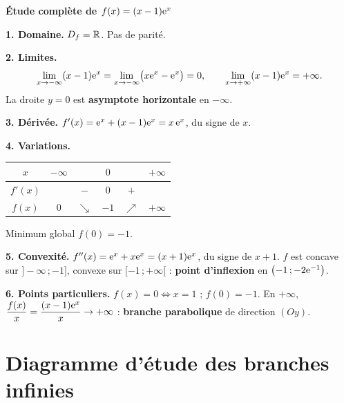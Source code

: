 \exerciceresolu
\textbf{Étude complète de $f(x)=(x-1)\mathrm{e}^{x}$}

\solution

\textbf{1. Domaine.} $D_f=\mathbb{R}$. Pas de parité.

\textbf{2. Limites.}
\[
\lim_{x\to-\infty}(x-1)\mathrm{e}^{x}=\lim_{x\to-\infty}\bigl(x\mathrm{e}^{x}-\mathrm{e}^{x}\bigr)=0,
\qquad
\lim_{x\to+\infty}(x-1)\mathrm{e}^{x}=+\infty.
\]
La droite $y=0$ est \textbf{asymptote horizontale} en $-\infty$.

\textbf{3. Dérivée.} $f'(x)=\mathrm{e}^{x}+(x-1)\mathrm{e}^{x}=x\,\mathrm{e}^{x}$, du signe de $x$.

\textbf{4. Variations.}
\begin{center}
\renewcommand{\arraystretch}{1.4}
\begin{tabular}{c|ccccc}
$x$      & $-\infty$ & & $0$ & & $+\infty$ \\
\hline
$f'(x)$  &  & $-$ & $0$ & $+$ & \\
\hline
$f(x)$   & $0$ & $\searrow$ & $-1$ & $\nearrow$ & $+\infty$ \\
\end{tabular}
\end{center}
Minimum global $f(0)=-1$.

\textbf{5. Convexité.} $f''(x)=\mathrm{e}^{x}+x\mathrm{e}^{x}=(x+1)\mathrm{e}^{x}$, du signe de
$x+1$. $f$ est concave sur $]-\infty\,;-1]$, convexe sur $[-1\,;+\infty[$ :
\textbf{point d'inflexion} en $\bigl(-1\,;-2\mathrm{e}^{-1}\bigr)$.

\textbf{6. Points particuliers.} $f(x)=0\iff x=1$ ; $f(0)=-1$.
En $+\infty$, $\dfrac{f(x)}{x}=\dfrac{(x-1)\mathrm{e}^{x}}{x}\to+\infty$ :
\textbf{branche parabolique} de direction $(Oy)$.

\begin{center}
\end{center}


\section{Diagramme d'étude des branches infinies}

